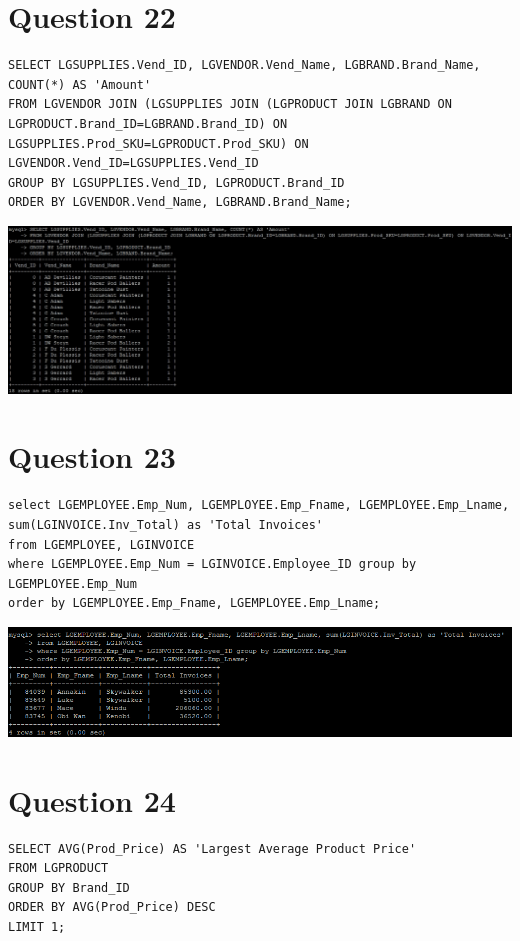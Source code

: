 \documentclass[a4paper,10pt]{article}
\begin{document}
\section {Question 22}
\lstset{
            language=SQL,
            breaklines=true
            }
        \begin{lstlisting}[frame=single]
        SELECT LGSUPPLIES.Vend_ID, LGVENDOR.Vend_Name, LGBRAND.Brand_Name, COUNT(*) AS 'Amount'
FROM LGVENDOR JOIN (LGSUPPLIES JOIN (LGPRODUCT JOIN LGBRAND ON LGPRODUCT.Brand_ID=LGBRAND.Brand_ID) ON LGSUPPLIES.Prod_SKU=LGPRODUCT.Prod_SKU) ON LGVENDOR.Vend_ID=LGSUPPLIES.Vend_ID
GROUP BY LGSUPPLIES.Vend_ID, LGPRODUCT.Brand_ID
ORDER BY LGVENDOR.Vend_Name, LGBRAND.Brand_Name;
        \end{lstlisting}
\includegraphics{Queries/Question_22/Q22_screenshot.jpg}
\section {Question 23}
\lstset{
            language=SQL,
            breaklines=true
            }
        \begin{lstlisting}[frame=single]
        select LGEMPLOYEE.Emp_Num, LGEMPLOYEE.Emp_Fname, LGEMPLOYEE.Emp_Lname, sum(LGINVOICE.Inv_Total) as 'Total Invoices' 
from LGEMPLOYEE, LGINVOICE 
where LGEMPLOYEE.Emp_Num = LGINVOICE.Employee_ID group by LGEMPLOYEE.Emp_Num 
order by LGEMPLOYEE.Emp_Fname, LGEMPLOYEE.Emp_Lname;
        \end{lstlisting}
\includegraphics{Queries/Question_23/Question_23_screenshot.PNG}
\section {Question 24}
\lstset{
            language=SQL,
            breaklines=true
            }
        \begin{lstlisting}[frame=single]
        SELECT AVG(Prod_Price) AS 'Largest Average Product Price'
FROM LGPRODUCT
GROUP BY Brand_ID
ORDER BY AVG(Prod_Price) DESC
LIMIT 1;
        \end{lstlisting}
\end{document}
